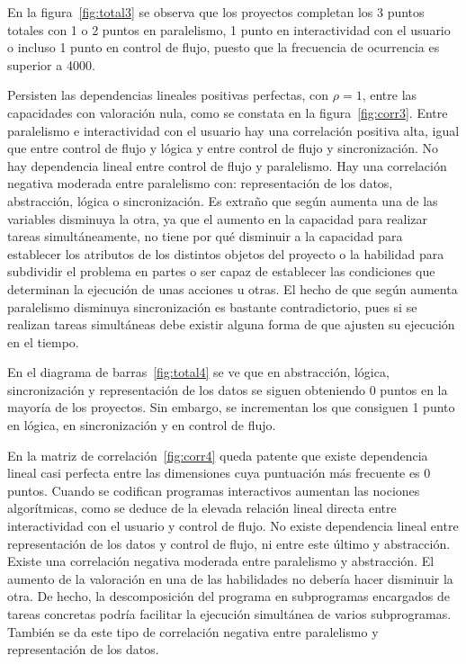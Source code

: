 \documentclass[a4paper, 12pt]{book}
\begin{document}
En la figura~\ref{fig:total3} se observa que los proyectos completan los 3 puntos totales con 1 o 2 puntos en paralelismo, 1 punto en interactividad con el usuario o incluso 1 punto en control de flujo, puesto que la frecuencia de ocurrencia es superior a 4000.

Persisten las dependencias lineales positivas perfectas, con $\rho=1$, entre las capacidades con valoración nula, como se constata en la figura~\ref{fig:corr3}. Entre paralelismo e interactividad con el usuario hay una correlación positiva alta, igual que entre control de flujo y lógica y entre control de flujo y sincronización. No hay dependencia lineal entre control de flujo y paralelismo. Hay una correlación negativa moderada entre paralelismo con: representación de los datos, abstracción, lógica o sincronización. Es extraño que según aumenta una de las variables disminuya la otra, ya que el aumento en la capacidad para realizar tareas simultáneamente, no tiene por qué disminuir a la capacidad para establecer los atributos de los distintos objetos del proyecto o la habilidad para subdividir el problema en partes o ser capaz de establecer las condiciones que determinan la ejecución de unas acciones u otras. El hecho de que según aumenta paralelismo disminuya sincronización es bastante contradictorio, pues si se realizan tareas simultáneas debe existir alguna forma de que ajusten su ejecución en el tiempo.

En el diagrama de barras~\ref{fig:total4} se ve que en abstracción, lógica, sincronización y representación de los datos se siguen obteniendo 0 puntos en la mayoría de los proyectos. Sin embargo, se incrementan los que consiguen 1 punto en lógica, en sincronización y en control de flujo.

En la matriz de correlación~\ref{fig:corr4} queda patente que existe dependencia lineal casi perfecta entre las dimensiones cuya puntuación más frecuente es 0 puntos. Cuando se codifican programas interactivos aumentan las nociones algorítmicas, como se deduce de la elevada relación lineal directa entre interactividad con el usuario y control de flujo. No existe dependencia lineal entre representación de los datos y control de flujo, ni entre este último y abstracción. Existe una correlación negativa moderada entre paralelismo y abstracción. El aumento de la valoración en una de las habilidades no debería hacer disminuir la otra. De hecho, la descomposición del programa en subprogramas encargados de tareas concretas podría facilitar la ejecución simultánea de varios subprogramas. También se da este tipo de correlación negativa entre paralelismo y representación de los datos.%
\end{document}
